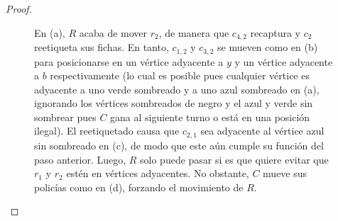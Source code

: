 \begin{proof}
\begin{enumerate}
\begin{figure}[ht!]
\begin{tcbitemize}
{\begin{tikzpicture}
                            \end{tikzpicture}
                    }
                \tcbitem
                    \tcblower
                \tcbitem
                    \tcblower
            \end{tcbitemize}
            \captionsetup{font=footnotesize}
            \caption{En (a), $R$ acaba de mover $r_2$, de manera que $c_{4,2}$
            recaptura y $c_2$ reetiqueta sus fichas. En tanto, $c_{1,2}$ y
            $c_{3,2}$ se mueven como en (b) para posicionarse en un v\'ertice
            adyacente a $y$ y un v\'ertice adyacente a $b$ respectivamente (lo
            cual es posible pues cualquier v\'ertice es adyacente a uno verde
            sombreado y a uno azul sombreado en (a), ignorando los v\'ertices
            sombreados de negro y el azul y verde sin sombrear pues $C$ gana al
            siguiente turno o est\'a en una posici\'on ilegal). El reetiquetado
            causa que $c_{2,1}$ sea adyacente al v\'ertice azul sin sombreado en
            (c), de modo que este a\'un cumple su funci\'on del paso anterior.
            Luego, $R$ solo puede pasar si es que quiere evitar que $r_1$ y
            $r_2$ est\'en en v\'ertices adyacentes. No obstante, $C$ mueve sus
            polic\'ias como en (d), forzando el movimiento de $R$.}
            \label{fig:guarding}
        \end{figure}


\end{enumerate}
\end{proof}
